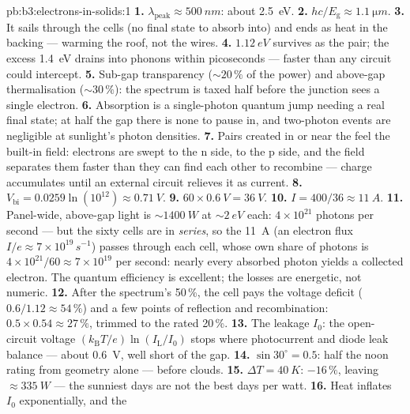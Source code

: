 \begin{solution}{pb:b3:electrons-in-solids:1}
\textbf{1.} $\lambda_{\text{peak}} \approx \qty{500}{nm}$:
about \qty{2.5}{eV}.
\textbf{2.} $hc/E_{\text{g}} \approx \qty{1.1}{\micro m}$.
\textbf{3.} It sails through the cells (no final state to absorb
into) and ends as heat in the backing --- warming the roof, not
the wires.
\textbf{4.} $\qty{1.12}{eV}$ survives as the pair; the excess
\qty{1.4}{eV} drains into phonons within picoseconds --- faster
than any circuit could intercept.
\textbf{5.} Sub-gap transparency ($\sim20\,\%$ of the power) and
above-gap thermalisation ($\sim30\,\%$): the spectrum is taxed
half before the junction sees a single electron.
\textbf{6.} Absorption is a single-photon quantum jump needing a
real final state; at half the gap there is none to pause in, and
two-photon events are negligible at sunlight's photon densities.
\textbf{7.} Pairs created in or near the  feel the
built-in field: electrons are swept to the n side,  to the
p side, and the field separates them faster than they can find
each other to recombine --- charge accumulates until an external
circuit relieves it as current.
\textbf{8.} $V_{\text{bi}} = 0.0259\ln(10^{12}) \approx
\qty{0.71}{V}$.
\textbf{9.} $60\times\qty{0.6}{V} = \qty{36}{V}$.
\textbf{10.} $I = 400/36 \approx \qty{11}{A}$.
\textbf{11.} Panel-wide, above-gap light is
$\sim\qty{1400}{W}$ at $\sim\qty{2}{eV}$ each: $4\times10^{21}$
photons per second --- but the sixty cells are in \emph{series},
so the \qty{11}{A} (an electron flux $I/e \approx
7\times10^{19}\,\unit{s^{-1}}$) passes through each cell, whose
own share of photons is $4\times10^{21}/60 \approx
7\times10^{19}$ per second: nearly every absorbed photon yields
a collected electron. The quantum efficiency is excellent; the
losses are energetic, not numeric.
\textbf{12.} After the spectrum's 50\,\%, the cell pays the
voltage deficit ($0.6/1.12 \approx 54\,\%$) and a few points of
reflection and recombination: $0.5\times0.54 \approx 27\,\%$,
trimmed to the rated 20\,\%.
\textbf{13.} The leakage $I_0$: the open-circuit voltage
$(k_{\text{B}}T/e)\ln(I_{\text{L}}/I_0)$ stops where
photocurrent and diode leak balance --- about \qty{0.6}{V}, well
short of the gap.
\textbf{14.} $\sin30^\circ = 0.5$: half the noon rating from
geometry alone --- before clouds.
\textbf{15.} $\Delta T = \qty{40}{K}$: $-16\,\%$, leaving
$\approx\qty{335}{W}$ --- the sunniest days are not the best
days per watt.
\textbf{16.} Heat inflates $I_0$ exponentially, and the

\end{solution}
